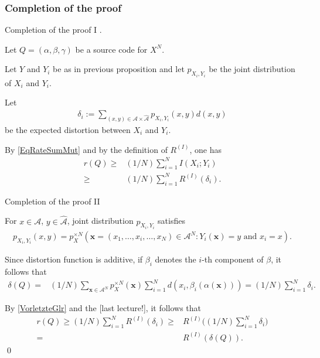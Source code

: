 \subsubsection{Completion of the proof}
\begin{frame}{Completion of the proof I}
.
\bit
\item Let $Q=(\alpha,\beta,\gamma)$ be a source code for $X^N$.
\item Let $Y$ and $Y_i$ be as in previous proposition and let $p_{X_i,Y_i}$ be the joint distribution of $X_i$ and $Y_i$.
\item Let 
\begin{align*}
\delta_i:=\sum_{(x,y)\in\mathcal{A}\times\hat{\mathcal{A}}}p_{X_i,Y_i}(x,y)d(x,y)
\end{align*}
be the expected distortion between $X_i$ and $Y_i$. 
\item By \eqref{EqRateSumMut} and by the definition of $R^{(I)}$, one has 
\begin{align}\label{VorletzteGlr}
r(Q)\geq &
(1/N) \sum_{i=1}^NI(X_i;Y_i)\nonumber\\ \geq &(1/N)\sum_{i=1}^NR^{(I)}(\delta_i).
\end{align}
\eit 
\end{frame}


\begin{frame}{Completion of the proof II}

\bit
\item For $x\in\mathcal{A}$, $y\in\widehat{\mathcal{A}}$, joint distribution $p_{X_i,Y_i}$ satisfies
\begin{align*}
p_{X_i,Y_i}(x,y)=p_X^{\times N}(\mathbf{x}=(x_1,\dots,x_i,\dots,x_N)\in\mathcal{A}^N\colon Y_i(\mathbf{x})=y\text{ and $x_i=x$}).%
\end{align*}
\item Since distortion function is additive, 
if $\beta_i$ denotes the $i$-th component of $\beta$, it follows that 
\begin{align*}
\delta(Q)=&(1/N)\sum_{\mathbf{x}\in\mathcal{A}^N}p_X^{\times N}(\mathbf{x})\sum_{i=1}^Nd(x_i,\beta_i(\alpha(\mathbf{x})))=(1/N)\sum_{i=1}^N\delta_i. 
\end{align*} 
\item By \eqref{VorletzteGlr} and the  [last lecture!], it follows that
\begin{align*}%
r(Q)\geq (1/N)\sum_{i=1}^NR^{(I)}(\delta_i)\geq & R^{(I)}\biggl((1/N)\sum_{i=1}^N\delta_i\biggr)\\ =&R^{(I)}(\delta(Q)).
\end{align*}
\qed
\eit
\end{frame}


